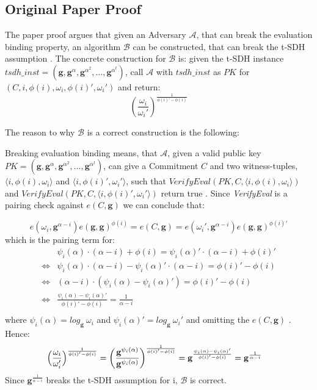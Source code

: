 \subsection{Original Paper Proof}
\label{security:binding:paper}
The paper \parencite{KZG} proof argues that given an Adversary $\mathcal{A}$, that can break the evaluation binding property, an algorithm $\mathcal{B}$ can be constructed, that can break the t-SDH assumption \parencite{KZG}. The concrete construction for $\mathcal{B}$ is: given the t-SDH instance $tsdh\_inst =(\mathbf{g}, \mathbf{g}^{\alpha}, \mathbf{g}^{\alpha^2},\dots, \mathbf{g}^{\alpha^t})$, call $\mathcal{A}$ with $tsdh\_inst$ as $PK$ for $(C,i,\phi(i),\omega_i,\phi(i)',\omega_i')$ and return: 
$$(\frac{\omega_i}{\omega_i'})^{\frac{1}{\phi(i)'-\phi(i)}}$$

The reason to why $\mathcal{B}$ is a correct construction is the following: 

Breaking evaluation binding means, that $\mathcal{A}$, given a valid public key $PK=(\mathbf{g}, \mathbf{g}^{\alpha}, \mathbf{g}^{\alpha^2},\dots, \mathbf{g}^{\alpha^t})$, can give a Commitment $C$ and two witness-tuples, $\langle i, \phi(i),\omega_i\rangle$ and $\langle i, \phi(i)', \omega_i'\rangle$, such that $VerifyEval(PK, C,\langle i,\phi(i), \omega_i\rangle )$ and $VerifyEval(PK, C,\langle i,\phi(i)', \omega_i'\rangle )$ return true \parencite{KZG}. Since \textit{VerifyEval} is a pairing check against $e(C,\mathbf{g})$ we can conclude that: 

$$e(\omega_i,\mathbf{g}^{\alpha-i})e(\mathbf{g}, \mathbf{g})^{\phi(i)} = e(C,\mathbf{g}) = e(\omega_i',\mathbf{g}^{\alpha-i})e(\mathbf{g}, \mathbf{g})^{\phi(i)'}$$
which is the pairing term for: 
\begin{equation*}
    \begin{aligned}
        &\psi_i(\alpha) \cdot (\alpha-i) + \phi(i) = \psi_i(\alpha)' \cdot (\alpha-i) + \phi(i)' \\
        \iff&  \psi_i(\alpha) \cdot (\alpha-i) - \psi_i(\alpha)' \cdot (\alpha-i) = \phi(i)' - \phi(i)\\
        \iff& (\alpha-i)  \cdot (\psi_i(\alpha) - \psi_i(\alpha)') = \phi(i)' - \phi(i)\\
        \iff& \frac{\psi_i(\alpha) - \psi_i(\alpha)'}{\phi(i)' - \phi(i)} = \frac{1}{\alpha - i}\\
    \end{aligned}
\end{equation*}
where $\psi_i(\alpha)= log_{\mathbf{g}}\ \omega_i$ and $\psi_i(\alpha)'= log_{\mathbf{g}}\ \omega_i'$ and omitting the $e(C,\mathbf{g})$
\parencite{KZG}.
Hence: 
\begin{equation*}
    \begin{aligned}
        &\Bigl(\frac{\omega_i}{\omega_i'}\Bigr)^{\frac{1}{\phi(i)'-\phi(i)}} 
        = \biggl(\frac{\mathbf{g}^{\psi_i(\alpha)}}{\mathbf{g}^{\psi_i(\alpha)}}\biggr)^{\frac{1}{\phi(i)'-\phi(i)}}
        = \mathbf{g}^{\frac{\psi_i(\alpha) - \psi_i(\alpha)'}{\phi(i)' - \phi(i)}}
        = \mathbf{g}^{\frac{1}{\alpha-i}}
    \end{aligned}
\end{equation*}
Since $\mathbf{g}^{\frac{1}{\alpha-i}}$ breaks the t-SDH assumption for i, $\mathcal{B}$ is correct.

